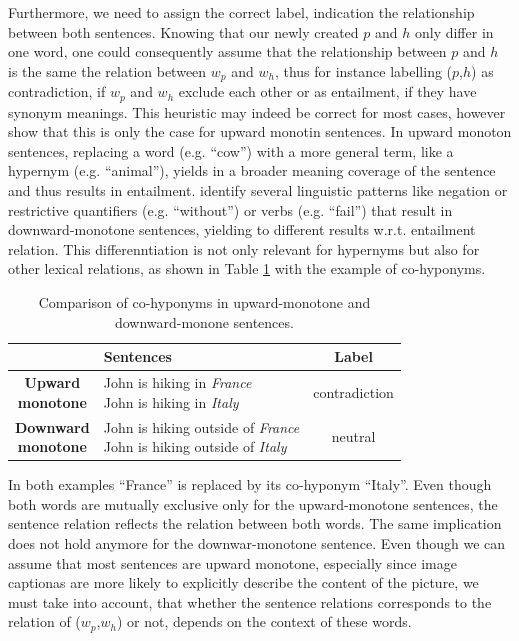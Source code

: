 \noindent
Furthermore, we need to assign the correct label, indication the relationship between both sentences. Knowing that our newly created $p$ and $h$ only differ in one word, one could consequently assume that the relationship between $p$ and $h$ is the same the relation between $w_p$ and $w_h$, thus for instance labelling ($p$,$h$) as contradiction, if $w_p$ and $w_h$ exclude each other or as entailment, if they have synonym meanings. This heuristic may indeed be correct for most cases, \cite{maccartney2007natural} however show that this is only the case for upward monotin sentences. In upward monoton sentences, replacing a word (e.g. ``cow'') with a more general term, like a hypernym (e.g. ``animal''), yields in a broader meaning coverage of the sentence and thus results in entailment. \cite{maccartney2007natural} identify several linguistic patterns like negation or restrictive quantifiers (e.g. ``without'') or verbs (e.g. ``fail'') that result in downward-monotone sentences, yielding to different results w.r.t. entailment relation. This differenntiation is not only relevant for hypernyms but also for other lexical relations, as shown in Table \ref{tab:monoton_samples} with the example of co-hyponyms.
\begin{table}[htt]
\centering
\begin{tabular}{c|lc}
& \textbf{Sentences} & \textbf{Label} \\
\toprule
\specialcellc{\textbf{Upward}\\\textbf{monotone}} & \specialcell{John is hiking in \textit{France}\\John is hiking in \textit{Italy}} & contradiction \\
\midrule
\specialcellc{\textbf{Downward}\\\textbf{monotone}} & \specialcell{John is hiking outside of \textit{France}\\John is hiking outside of \textit{Italy}} & neutral \\
\bottomrule
\end{tabular}
\label{tab:monoton_samples}
 \caption{Comparison of co-hyponyms in upward-monotone and downward-monone sentences.}
\end{table}
In both examples ``France'' is replaced by its co-hyponym ``Italy''. Even though both words are mutually exclusive only for the upward-monotone sentences, the sentence relation reflects the relation between both words. The same implication does not hold anymore for the downwar-monotone sentence. Even though we can assume that most sentences are upward monotone, especially since image captionas are more likely to explicitly describe the content of the picture, we must take into account, that whether the sentence relations corresponds to the relation of ($w_p$,$w_h$) or not, depends on the context of these words.

